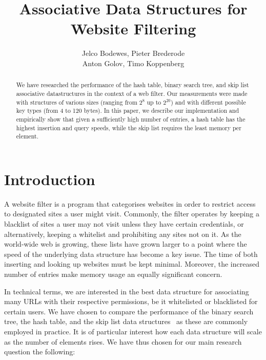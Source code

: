 \documentclass[12pt,a4paper]{article}
\title{Associative Data Structures for Website Filtering}
\author{Jelco Bodewes, Pieter Brederode \\ Anton Golov, Timo Koppenberg }
\begin{document}
    \maketitle

    \begin{abstract}
        We have researched the performance of the hash table, binary search tree, and skip list
        associative datastructures in the context of a web filter.  Our measurements were made with
        structures of various sizes (ranging from $2^8$ up to $2^{20}$) and with different possible
        key types (from 4 to 120 bytes).  In this paper, we describe our implementation and
        empirically show that given a sufficiently high number of entries, a hash table has the
        highest insertion and query speeds, while the skip list requires the least memory per
        element.
    \end{abstract}


    \section{Introduction}
    A website filter is a program that categorises websites in order to restrict access to
    designated sites a user might visit. Commonly, the filter operates by keeping a blacklist of
    sites a user may not visit unless they have certain credentials, or alternatively, keeping a
    whitelist and prohibiting any sites not on it.  As the world-wide web is growing, these lists
    have grown larger to a point where the speed of the underlying data structure has become a key
    issue.  The time of both inserting and looking up websites must be kept minimal. Moreover, the
    increased number of entries make memory usage an equally significant concern.

    In technical terms, we are interested in the best data structure for associating many URLs with
    their respective permissions, be it whitelisted or blacklisted for certain users.  We have
    chosen to compare the performance of the binary search tree, the hash table, and the skip list
    data structures~\cite{Algorithms} as these are commonly employed in practice.  It is of
    particular interest how each data structure will scale as the number of elements rises.  We have
    thus chosen for our main research question the following:
\end{document}
